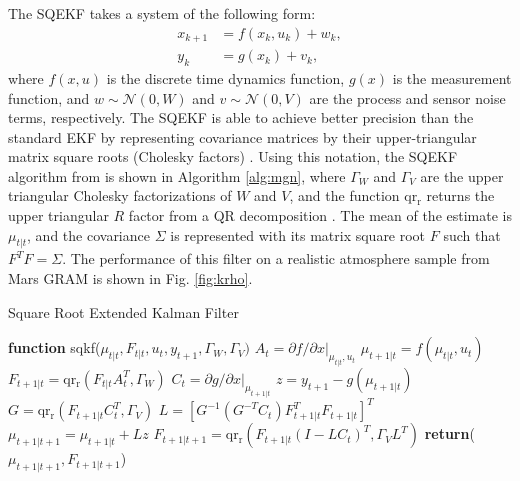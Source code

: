 The SQEKF takes a system of the following form:
\begin{align}
	x_{k+1} &= f(x_k,u_k) + w_k , \\ 
    y_k &= g(x_k) + v_k ,
\end{align}
where $f(x,u)$ is the discrete time dynamics function, $g(x)$ is the measurement function, and $w \sim \mathcal{N}(0,W)$ and $v \sim \mathcal{N}(0,V)$ are the process and sensor noise terms, respectively. The SQEKF is able to achieve better precision than the standard EKF by representing covariance matrices by their upper-triangular matrix square roots (Cholesky factors) \cite{simon2006,vandermerwe2001,bar-shalom2002}. %
Using this notation, the SQEKF algorithm from \cite{tracy2022f} is shown in Algorithm \ref{alg:mgn}, where $\Gamma_W$ and $\Gamma_V$ are the upper triangular Cholesky factorizations of $W$ and $V$, and the function $\operatorname{qr_r}$ returns the upper triangular $R$ factor from a QR decomposition \cite{strang1968,howell2019}. The mean of the estimate is $\mu_{t|t}$, and the covariance $\Sigma$ is represented with its matrix square root $F$ such that $F^TF = \Sigma$. The performance of this filter on a realistic atmosphere sample from Mars GRAM is shown in Fig. \ref{fig:krho}. 
\begin{algorithm} 
	\begin{algorithmic}[1]
		\caption{Square Root Extended Kalman Filter}\label{alg:mgn}
		\State \textbf{function}  sqkf($\mu_{t|t},F_{t|t},u_t,y_{t+1},\Gamma_W,\Gamma_V)$
		\State 
            \State \quad $A_t = \partial f / \partial x |_{\mu_{t|t},u_t}$ 
		\State \quad $\mu_{t+1|t} = f(\mu_{t|t},u_t) $ 
		\State \quad $F_{t+1|t} = \operatorname{qr_r} ( F_{t|t} A_t^T , \Gamma_W)$ 
		\State 
  \State \quad $C_t = \partial g / \partial x |_{\mu_{t+1|t}}$ 
        \State \quad $z = y_{t+1} - g(\mu_{t+1|t})$ 
        \State \quad $G = \operatorname{qr_r}(F_{t+1|t} C_t^T, \Gamma_V)$ 
        \State \quad $L = [G^{-1}(G^{-T} C_t) F_{t+1|t}^TF_{t+1|t}]^T$ 
        \State 
        \State \quad $\mu_{t+1|t+1} = \mu_{t+1|t} + Lz $ 
        \State \quad $F_{t+1|t+1} = \operatorname{qr_r}(F_{t+1|t}(I-LC_t)^T, \Gamma_VL^T)$ 
        \State 
        \State \quad \textbf{return}($\mu_{t+1|t+1}, F_{t+1|t+1}$)
	\end{algorithmic}
\end{algorithm}
